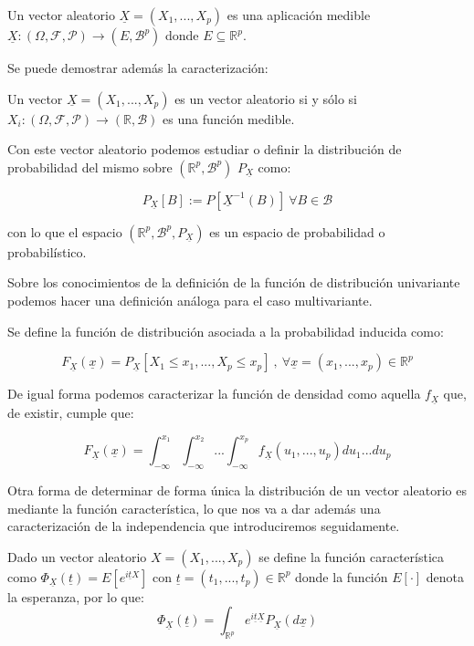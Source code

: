 \begin{definicion}
	Un vector aleatorio $\underline{X} = (X_1 , ... , X_p)$ es una aplicación medible $\underline{X}: (\Omega , \mathcal{F}, \mathcal{P})\rightarrow (E, \mathcal{B}^p)$ donde $E\subseteq \mathbb{R}^p$.
\end{definicion}

Se puede demostrar además la caracterización:

\begin{proposicion}
	Un vector $\underline{X} = (X_1, ..., X_p)$ es un vector aleatorio si y sólo si $X_i : (\Omega , \mathcal{F}, \mathcal{P}) \rightarrow (\mathbb{R}, \mathcal{B})$ es una función medible.
\end{proposicion}

Con este vector aleatorio podemos estudiar o definir la distribución de probabilidad del mismo sobre $( \mathbb{R}^p , \mathcal{B}^p )$ $P_{\underline{X}}$ como:

$$P_{\underline{X}} [B]:= P[\underline{X}^{-1}(B)] \ \forall B\in \mathcal{B}$$

con lo que el espacio $(\mathbb{R}^p , \mathcal{B}^p , P_{\underline{X}})$ es un espacio de probabilidad o probabilístico.

Sobre los conocimientos de la definición de la función de distribución univariante podemos hacer una definición análoga para el caso multivariante.

\begin{definicion}
	Se define la función de distribución asociada a la probabilidad inducida como:
	
	$$F_{\underline{X}} (\underline{x}) = P_{\underline{X}} [X_1 \leq x_1 , ... , X_p \leq x_p] \ , \ \forall \underline{x} = (x_1 , ... , x_p) \in \mathbb{R}^p$$
\end{definicion}

De igual forma podemos caracterizar la función de densidad como aquella $f_{\underline{X}}$ que, de existir, cumple que:

$$F_{\underline{X}} (\underline{x}) = \int_{- \infty}^{x_1} \int_{-\infty}^{x_2} ... \int_{-\infty}^{x_p} f_{\underline{X}}(u_1 , ... , u_p) du_1 ... du_p$$

Otra forma de determinar de forma única la distribución de un vector aleatorio es mediante la función característica, lo que nos va a dar además una caracterización de la independencia que introduciremos seguidamente.

\begin{definicion}
	Dado un vector aleatorio $X = (X_1 , ... , X_p)$ se define la función característica como $\Phi_{\underline{X}} (\underline{t}) = E[e^{i\underline{t}X}]$ con $\underline{t} = (t_1 , ... , t_p)\in \mathbb{R}^p$ donde la función $E[\cdot]$ denota la esperanza, por lo que:
	$$\Phi_{\underline{X}} (\underline{t}) = \int_{\mathbb{R}^p} e^{i\underline{t} \underline{X}} P_{\underline{X}}(d\underline{x})$$
\end{definicion}

